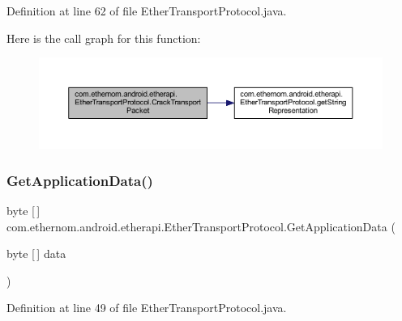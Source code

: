 Definition at line 62 of file Ether\+Transport\+Protocol.\+java.

Here is the call graph for this function\+:\nopagebreak
\begin{figure}[H]
\begin{center}
\leavevmode
\includegraphics[width=350pt]{classcom_1_1ethernom_1_1android_1_1etherapi_1_1_ether_transport_protocol_ab653c54f20447fb1f71e55e56322b4f1_cgraph}
\end{center}
\end{figure}
\mbox{\label{classcom_1_1ethernom_1_1android_1_1etherapi_1_1_ether_transport_protocol_adc5e3627f32f692dec5c6b6037fdfe3e}} 
\subsubsection{\texorpdfstring{Get\+Application\+Data()}{GetApplicationData()}}
{\footnotesize\ttfamily byte \mbox{[}$\,$\mbox{]} com.\+ethernom.\+android.\+etherapi.\+Ether\+Transport\+Protocol.\+Get\+Application\+Data (\begin{DoxyParamCaption}\item[{byte \mbox{[}$\,$\mbox{]}}]{data }\end{DoxyParamCaption})}



Definition at line 49 of file Ether\+Transport\+Protocol.\+java.


